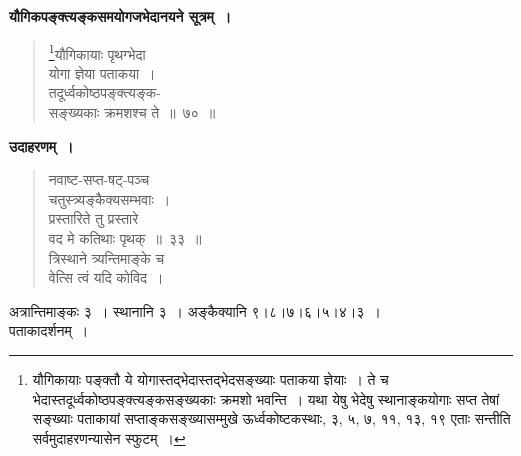 \documentclass[11pt, openany]{book}
\begin{document}
\textbf{यौगिकपङ्क्त्यङ्कसमयोगजभेदानयने सूत्रम्~।}

\begin{quote}
\renewcommand{\thefootnote}{१}\footnote{यौगिकायाः पङ्क्तौ ये योगास्तद्भेदास्तद्भेदसङ्ख्याः पताकया ज्ञेयाः~। ते च भेदास्तदूर्ध्वकोष्ठपङ्क्त्यङ्कसङ्ख्यकाः क्रमशो भवन्ति~। यथा येषु भेदेषु स्थानाङ्कयोगाः सप्त तेषां सङ्ख्याः पताकायां सप्ताङ्कसङ्ख्यासम्मुखे ऊर्ध्वकोष्टकस्थाः, ३, ५, ७, ११, १३, १९ एताः सन्तीति सर्वमुदाहरणन्यासेन स्फुटम्~।}{\gk यौगिकायाः पृथग्भेदा\\
योगा ज्ञेया पताकया~।\\
तदूर्ध्वकोष्ठपङ्क्त्यङ्क-\\
सङ्ख्यकाः क्रमशश्च ते~॥~७०~॥	}
\end{quote}

\newpage

\textbf{उदाहरणम्~।}

\begin{quote}
{\ex नवाष्ट-सप्त-षट्-पञ्च\\
चतुस्त्र्यङ्कैक्यसम्भवाः~।\\
प्रस्तारिते तु प्रस्तारे\\
वद मे कतिथाः पृथक्~॥~३३~॥\\
त्रिस्थाने त्र्यन्तिमाङ्के च\\
वेत्सि त्वं यदि कोविद~।	}
\end{quote}

अत्रान्तिमाङ्कः ३~। स्थानानि ३~। अङ्कैक्यानि ९।८।७।६।५।४।३~।\\

पताकादर्शनम्~।
\end{document}
